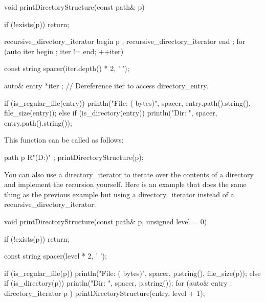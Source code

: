 \begin{cpp}
void printDirectoryStructure(const path& p)
{
    if (!exists(p)) { return; }

    recursive_directory_iterator begin { p };
    recursive_directory_iterator end { };
    for (auto iter { begin }; iter != end; ++iter) {

        const string spacer(iter.depth() * 2, ' ');

        auto& entry { *iter }; // Dereference iter to access directory_entry.

        if (is_regular_file(entry)) {
            println("{}File: {} ({} bytes)",
            spacer, entry.path().string(), file_size(entry));
        } else if (is_directory(entry)) {
            println("{}Dir: {}", spacer, entry.path().string());
        }
    }
}
\end{cpp}

This function can be called as follows:

\begin{cpp}
path p { R"(D:\Foo\Bar)" };
printDirectoryStructure(p);
\end{cpp}

You can also use a directory\_iterator to iterate over the contents of a directory and implement the recursion yourself. Here is an example that does the same thing as the previous example but using a directory\_iterator instead of a recursive\_directory\_iterator:

\begin{cpp}
void printDirectoryStructure(const path& p, unsigned level = 0)
{
    if (!exists(p)) { return; }

    const string spacer(level * 2, ' ');

    if (is_regular_file(p)) {
        println("{}File: {} ({} bytes)", spacer, p.string(), file_size(p));
    } else if (is_directory(p)) {
        println("{}Dir: {}", spacer, p.string());
        for (auto& entry : directory_iterator { p }) {
            printDirectoryStructure(entry, level + 1);
        }
    }
}
\end{cpp}










